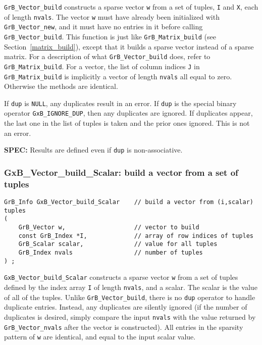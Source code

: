 \documentclass[12pt]{article}
\begin{document}
\verb'GrB_Vector_build' constructs a sparse vector \verb'w' from a set of
tuples, \verb'I' and \verb'X', each of length \verb'nvals'.  The vector
\verb'w' must have already been initialized with \verb'GrB_Vector_new', and it
must have no entries in it before calling \verb'GrB_Vector_build'.
This function is just like \verb'GrB_Matrix_build' (see
Section~\ref{matrix_build}), except that it builds a sparse vector instead of a
sparse matrix.  For a description of what \verb'GrB_Vector_build' does, refer
to \verb'GrB_Matrix_build'.  For a vector, the list of column indices \verb'J'
in \verb'GrB_Matrix_build' is implicitly a vector of length \verb'nvals' all
equal to zero.  Otherwise the methods are identical.

If \verb'dup' is \verb'NULL', any duplicates result in an error.
If \verb'dup' is the special binary operator \verb'GxB_IGNORE_DUP', then
any duplicates are ignored.  If duplicates appear, the last one in the
list of tuples is taken and the prior ones ignored.  This is not an error.

\begin{alert}
{\bf SPEC:} Results are defined even if \verb'dup' is non-associative.
\end{alert}

\subsubsection{{\sf GxB\_Vector\_build\_Scalar:} build a vector from a set of tuples}
\label{vector_build_Scalar}

\begin{mdframed}[userdefinedwidth=6in]
{\footnotesize
\begin{verbatim}
GrB_Info GxB_Vector_build_Scalar    // build a vector from (i,scalar) tuples
(
    GrB_Vector w,                   // vector to build
    const GrB_Index *I,             // array of row indices of tuples
    GrB_Scalar scalar,              // value for all tuples
    GrB_Index nvals                 // number of tuples
) ;
\end{verbatim} } \end{mdframed}

\verb'GxB_Vector_build_Scalar' constructs a sparse vector \verb'w' from a set
of tuples defined by the index array \verb'I' of length \verb'nvals', and a
scalar.  The scalar is the value of all of the tuples.  Unlike
\verb'GrB_Vector_build', there is no \verb'dup' operator to handle duplicate
entries.  Instead, any duplicates are silently ignored (if the number of
duplicates is desired, simply compare the input \verb'nvals' with the value
returned by \verb'GrB_Vector_nvals' after the vector is constructed).  All
entries in the sparsity pattern of \verb'w' are identical, and equal to the
input scalar value.
\end{document}
